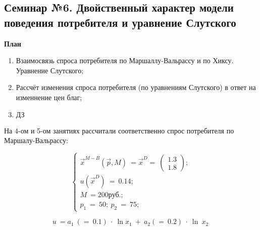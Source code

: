 \documentclass[12pt,a4paper]{article}
\author{Аверьянов Тимофей, Корякин Алексей}
\begin{document}
\begin{center}
\section*{Семинар №6. Двойственный характер модели поведения потребителя и уравнение Слутского}

\textbf{План}
\end{center}

\begin{enumerate}
\item Взаимосвязь спроса потребителя по Маршаллу-Вальрассу и по Хиксу. Уравнение Слутского;
\item Рассчёт изменения спроса потребителя (по уравнениям Слутского) в ответ на изменнение цен благ;
\item $\displaystyle \boxed{\text{ДЗ}}$
\end{enumerate}

На 4-ом и 5-ом занятиях рассчитали соответственно спрос потребителя по Маршалу-Вальрассу:


\begin{equation*}
\begin{cases}
\vec{x}^{M-B}\left(\vec{p} ,M\right) \ =\vec{x}^{D} =\ \begin{pmatrix}
1.3\\
1.8
\end{pmatrix} ;\\
u\left(\vec{x}^{D}\right) \ =\ 0.14;\\
M\ =200\text{руб.} ;\\
p_{1} \ =\ 50;\ p_{2} \ =\ 75;
\end{cases}
\end{equation*}

\begin{equation*}
\boxed{u\ =a_{1} \ ( =\ 0.1) \ \cdotp \ \ln x_{1} \ +\ a_{2}( =\ 0.2) \ \cdotp \ \ln \ x_{2} \ }
\end{equation*}
\end{document}
